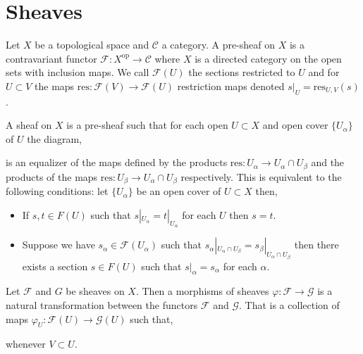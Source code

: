 \documentclass[12pt]{extarticle}
\theoremstyle{definition}
\newenvironment{definition}[1][Definition:]{\begin{trivlist}
\item[\hskip \labelsep {\bfseries #1}]}{\end{trivlist}}
\newcommand{\res}{\mathrm{res}}
\newcommand{\F}{\mathcal{F}}
\newcommand{\G}{\mathcal{G}}
\begin{document}
\section{Sheaves}

\begin{definition}
Let $X$ be a topological space and $\mathcal{C}$ a category. A pre-sheaf on $X$ is a contravariant functor $\F : X^{\mathrm{op}} \to \mathcal{C}$ where $X$ is a directed category on the open sets with inclusion maps. We call $\F(U)$ the sections restricted to $U$ and for $U \subset V$ the maps $\res : \F(V) \to \F(U)$ restriction maps denoted $s|_U = \res_{U, V}(s)$.    
\end{definition}

\begin{definition}
A sheaf on $X$ is a pre-sheaf such that for each open $U \subset X$ and open cover $\{ U_{\alpha} \}$ of $U$ the diagram,
\begin{center}
\end{center}
is an equalizer of the maps defined by the products $\res : U_{\alpha} \to U_{\alpha} \cap U_{\beta} $ and the products of the maps $\res : U_{\beta} \to U_{\alpha} \cap U_{\beta}$ respectively. This is equivalent to the following conditions: let $\{ U_{\alpha} \}$ be an open cover of $U \subset X$ then,
\begin{itemize}
\item If $s, t \in F(U)$ such that $s|_{U_{\alpha}} = t|_{U_{\alpha}}$ for each $U$ then $s = t$.

\item Suppose we have $s_{\alpha} \in \F(U_{\alpha})$ such that $s_{\alpha}|_{U_{\alpha} \cap U_{\beta}} = s_{\beta}|_{U_{\alpha} \cap U_{\beta}}$ then there exists a section $s \in F(U)$ such that $s|_{\alpha} = s_{\alpha}$ for each $\alpha$. 
\end{itemize} 
\end{definition}

\begin{definition}
Let $\F$ and $G$ be sheaves on $X$. Then a morphisms of sheaves $\varphi : \F \to \G$ is a natural transformation between the functors $\F$ and $\G$. That is a collection of maps $\varphi_U : \F(U) \to \G(U)$ such that,
\begin{center}
\end{center} 
whenever $V \subset U$. 
\end{definition}
\end{document}
